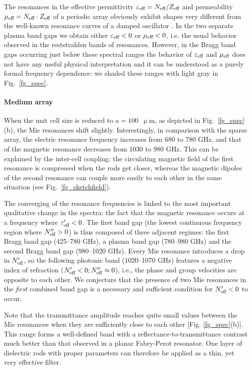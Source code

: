 The resonances in the effective permittivity $\varepsilon_{\text{eff} }=N_{\text{eff} }/Z_{\text{eff} }$ and permeability $\mu_{\text{eff} } = N_{\text{eff} }\cdot Z_{\text{eff} }$ of a periodic array obviously exhibit shapes very different from the well-known resonance curves of a damped oscillator \cite{koschny2003resonant}. In the two separate plasma band gaps we obtain either $\varepsilon_{\text{eff} } < 0$ or $\mu_{\text{eff} }<0$, i.e. the usual behavior observed in the reststrahlen bands of resonances. However, in the Bragg band gaps occurring just below these spectral ranges the behavior of $\varepsilon_{\text{eff} }$ and $\mu_{\text{eff} }$ does not have any useful physical interpretation and it can be understood as a purely formal frequency dependence: we shaded these ranges with light gray in Fig.~\ref{fg_spec}.
\paragraph{Medium array}%
When the unit cell size is reduced to $a=100$~$\upmu$m, as depicted in Fig.~\ref{fg_spec}(b), the Mie resonances shift slightly. Interestingly, in comparison with the sparse array, the electric resonance frequency increases from 680 to 780 GHz, and that of the magnetic resonance decreases from 1030 to 980 GHz. This can be explained by the inter-cell coupling: the circulating magnetic field of the first resonance is compressed when the rods get closer, whereas the magnetic dipoles of the second resonance can couple more easily to each other in the same situation (see Fig.~\ref{fg_sketchfield}).

The converging of the resonance frequencies is linked to the most important qualitative change in the spectra: the fact that the magnetic resonance occurs at a frequency where $\varepsilon_{\text{eff} }'<0$. The first band gap (the lowest continuous frequency region where $N_{\text{eff} }''>0$) is thus composed of three adjacent regimes: the first Bragg band gap (425--780 GHz), a plasma band gap (780--980 GHz) and the second Bragg band gap (980--1020 GHz). Every Mie resonance introduces a drop in $N_{\text{eff} }'$, so the following photonic band (1020--1070 GHz) features a negative index of refraction ($N_{\text{eff} }'<0; N_{\text{eff} }''\approx 0$), i.e., the phase and group velocities are opposite to each other. We conjecture that the presence of two Mie resonances in the \textit{first} combined band gap is a necessary and sufficient condition for $N_{\text{eff} }'<0$ to occur.

Note that the transmittance amplitude reaches quite small values between the Mie resonances when they are sufficiently close to each other [Fig. \ref{fg_spec}(b)]. This range forms a well-defined band with a reflectance-to-transmittance contrast much better than that observed in a planar Fabry-Perot resonator. One layer of dielectric rods with proper parameters can therefore be applied as a thin, yet very effective filter.
